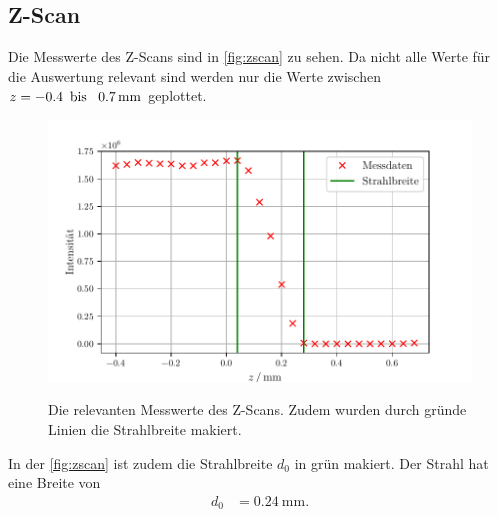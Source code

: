 \subsection{Z-Scan}
Die Messwerte des Z-Scans sind in \autoref{fig:zscan} zu sehen.
Da nicht alle Werte für die Auswertung relevant sind werden nur die Werte zwischen $z = -0.4 \text{\, bis \, } 0.7 \, \si{\milli\meter}$ geplottet.
\begin{figure}
    \centering
    \caption{Die relevanten Messwerte des Z-Scans. Zudem wurden durch gründe Linien die Strahlbreite makiert.}
    \includegraphics[width=\textwidth]{content/data/zscan.pdf}
    \label{fig:zscan}
\end{figure}
In der \autoref{fig:zscan} ist zudem die Strahlbreite $d_0$ in grün makiert.
Der Strahl hat eine Breite von 
\begin{align*}
    d_0 &= \SI{0.24}{\milli\meter}.
\end{align*}
\FloatBarrier
